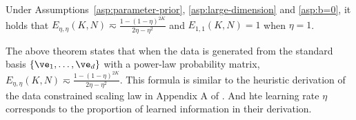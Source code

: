 \begin{theorem} \label{thm:one-hot-E_K-b=0}
    Under Assumptions~\ref{asp:parameter-prior}, \ref{asp:large-dimension} and \ref{asp:b=0}, it holds that $E_{\eta,\eta}(K, N)\eqsim \frac{1-(1-\eta)^{2K}}{2\eta-\eta^2}$ and $E_{1,1}(K, N) = 1$ when $\eta = 1$.
\end{theorem}
The above theorem states that when the data is generated from the standard basis $\{\ve_1,\dots,\ve_d\}$ with a power-law probability matrix, $E_{\eta,\eta}(K, N)\eqsim \frac{1-(1-\eta)^{2K}}{2\eta-\eta^2}$. This formula is similar to the heuristic derivation of the data constrained scaling law in Appendix A of \citep{muennighoff2023scaling}. And hte learning rate $\eta$ corresponds to the proportion of learned information in their derivation. 

